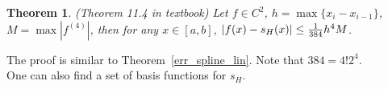 \documentclass{article} %
\theoremstyle{break}
\newtheorem{definition}{Definition}[section]
\newtheorem{thm}[definition]{Theorem}
\begin{document}
\begin{thm}\label{err_spline_her} (Theorem 11.4 in textbook)
Let $f\in C^2$, $h=\max\{x_i-x_{i-1}\}$, $M=\max|f^{(4)}|$, then for any $x\in [a, b]$, $|f(x)-s_H(x)|\leq {1\over 384}h^4M$.
\end{thm}
The proof is similar to Theorem~\ref{err_spline_lin}. Note that $384=4!2^4$.\\

One can also find a set of basis functions for $s_H$.






\end{document}
